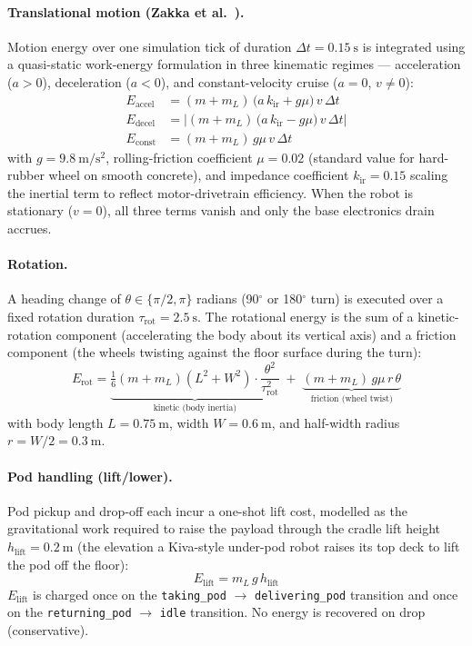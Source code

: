 \documentclass[conference]{IEEEtran}
\begin{document}
\paragraph{Translational motion (Zakka et al.~\cite{zakka2025}).}
Motion energy over one simulation tick of duration $\Delta t = \SI{0.15}{\second}$ is integrated using a quasi-static work-energy formulation in three kinematic regimes --- acceleration ($a > 0$), deceleration ($a < 0$), and constant-velocity cruise ($a = 0$, $v \neq 0$):
\begin{align}
  E_\text{accel} &= (m + m_L)\,\big( a\,k_\text{ir} + g\mu \big)\,v\,\Delta t \label{eq:e_accel}\\
  E_\text{decel} &= \Big| (m + m_L)\,\big( a\,k_\text{ir} - g\mu \big)\,v\,\Delta t \Big| \label{eq:e_decel}\\
  E_\text{const} &= (m + m_L)\,g\mu\,v\,\Delta t \label{eq:e_const}
\end{align}
with $g = \SI{9.8}{\meter\per\second\squared}$, rolling-friction coefficient $\mu = 0.02$ (standard value for hard-rubber wheel on smooth concrete), and impedance coefficient $k_\text{ir} = 0.15$ scaling the inertial term to reflect motor-drivetrain efficiency. When the robot is stationary ($v = 0$), all three terms vanish and only the base electronics drain accrues.

\paragraph{Rotation.}
A heading change of $\theta \in \{\pi/2, \pi\}$ radians (90$^\circ$ or 180$^\circ$ turn) is executed over a fixed rotation duration $\tau_\text{rot} = \SI{2.5}{\second}$. The rotational energy is the sum of a kinetic-rotation component (accelerating the body about its vertical axis) and a friction component (the wheels twisting against the floor surface during the turn):
\begin{equation}
  E_\text{rot} = \underbrace{\tfrac{1}{6}(m+m_L)(L^2 + W^2) \cdot \frac{\theta^2}{\tau_\text{rot}^2}}_{\text{kinetic (body inertia)}}\;+\;\underbrace{(m+m_L)\,g\mu\,r\,\theta}_{\text{friction (wheel twist)}}
  \label{eq:e_rot}
\end{equation}
with body length $L = \SI{0.75}{\meter}$, width $W = \SI{0.6}{\meter}$, and half-width radius $r = W/2 = \SI{0.3}{\meter}$.

\paragraph{Pod handling (lift/lower).}
Pod pickup and drop-off each incur a one-shot lift cost, modelled as the gravitational work required to raise the payload through the cradle lift height $h_\text{lift} = \SI{0.2}{\meter}$ (the elevation a Kiva-style under-pod robot raises its top deck to lift the pod off the floor):
\begin{equation}
  E_\text{lift} = m_L\,g\,h_\text{lift}
  \label{eq:e_lift}
\end{equation}
$E_\text{lift}$ is charged once on the \texttt{taking\_pod} $\to$ \texttt{delivering\_pod} transition and once on the \texttt{returning\_pod} $\to$ \texttt{idle} transition. No energy is recovered on drop (conservative).
\end{document}
